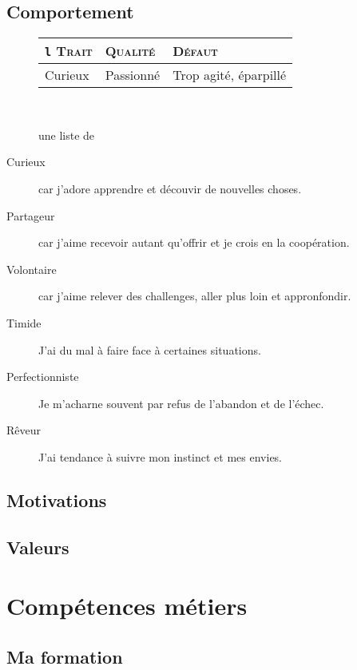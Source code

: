 \documentclass[a4paper,12pt, draft]{report}
\begin{document}
\subsection{Comportement}
\begin{figure}[h]
  \begin{tabular}{|l|l|l|}
    \hline
  \item \texttt{l} \textsc{Trait} & \textsc{Qualité} & \textsc{Défaut}\\
    \hline
    \hline
  \item Curieux & Passionné & Trop agité, éparpillé \\
    \hline
    
  \end{tabular}\\
\caption{une liste de}
\end{figure}

\begin{description}
\item [Curieux]car j'adore apprendre et découvir de nouvelles choses.
\item [Partageur]car j'aime recevoir autant qu'offrir et je crois en la coopération.
\item [Volontaire]car j'aime relever des challenges, aller plus loin et appronfondir.
\end{description}

\begin{description}
\item [Timide]J'ai du mal à faire face à certaines situations.
\item [Perfectionniste]Je m'acharne souvent par refus de l'abandon et de l'échec.
\item [Rêveur]J'ai tendance à suivre mon instinct et mes envies.
\end{description}

\subsection{Motivations}
\subsection{Valeurs}

\section{Compétences métiers} 
\subsection{Ma formation}
\end{document}
